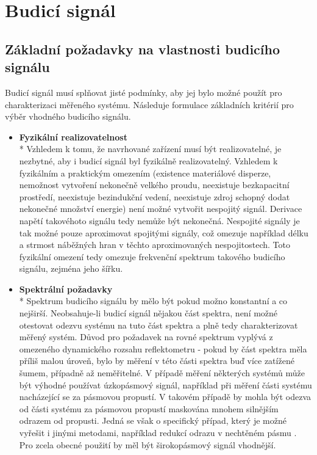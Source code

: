 \chapter{Budicí signál}

\section{Základní požadavky na vlastnosti budicího signálu}
Budicí signál musí splňovat jisté podmínky, aby jej bylo možné použít pro charakterizaci měřeného systému. Následuje formulace základních kritérií pro výběr vhodného budicího signálu.

\begin{itemize}
	\item
	\textbf{Fyzikální realizovatelnost}\\*
	Vzhledem k tomu, že navrhované zařízení musí být realizovatelné, je nezbytné, aby i budicí signál byl fyzikálně realizovatelný. Vzhledem k fyzikálním a praktickým omezením (existence materiálové disperze, nemožnost vytvoření nekonečně velkého proudu, neexistuje bezkapacitní prostředí, neexistuje bezindukční vedení, neexistuje zdroj schopný dodat nekonečné množství energie) není možné vytvořit nespojitý signál. Derivace napětí takovéhoto signálu tedy nemůže být nekonečná. Nespojité signály je tak možné pouze aproximovat spojitými signály, což omezuje například délku a strmost náběžných hran v těchto aproximovaných nespojitostech. Toto fyzikální omezení tedy omezuje frekvenční spektrum takového budicího signálu, zejména jeho šířku.
	
	\item
	\textbf{Spektrální požadavky}\\*	
	Spektrum budicího signálu by mělo být pokud možno konstantní a co nejširší. Neobsahuje-li budicí signál nějakou část spektra, není možné otestovat odezvu systému na tuto část spektra a plně tedy charakterizovat měřený systém. Důvod pro požadavek na rovné spektrum vyplývá z omezeného dynamického rozsahu reflektometru - pokud by část spektra měla příliš malou úroveň, bylo by měření v této části spektra buď více zatížené šumem, případně až neměřitelné. V případě měření některých systémů může být výhodné používat úzkopásmový signál, například při měření části systému nacházející se za pásmovou propustí. V takovém případě by mohla být odezva od části systému za pásmovou propustí maskována mnohem silnějším odrazem od propusti. Jedná se však o specifický případ, který je možné vyřešit i jinými metodami, například redukcí odrazu v nechtěném pásmu \cite{sincgausstdr}. Pro zcela obecné použití by měl být širokopásmový signál vhodnější.
	

\end{itemize}
